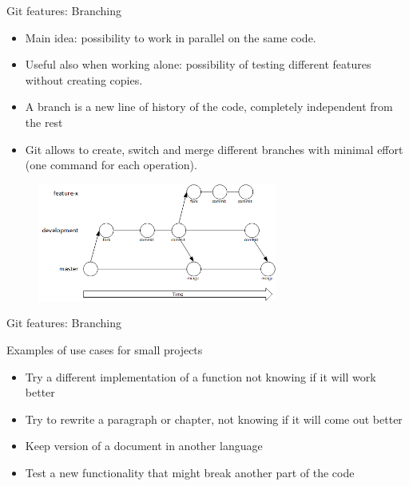 \documentclass{beamer}
\newcommand{\git}{Git{}}
\begin{document}
\begin{frame}{\git{} features: Branching}
    \begin{itemize}
    \justifying
        \item Main idea: possibility to \alert{work in parallel} on the same code. 
        \item Useful also when working alone: possibility of \alert{testing different features} without creating copies. 
        \item A \alert{branch} is a new line of history of the code, completely independent from the rest
        \item \git{} allows to \alert{create}, \alert{switch} and \alert{merge} different branches with minimal effort (one command for each operation).
    \end{itemize}

    \begin{figure}
        \centering
        \includegraphics[width=0.7\textwidth]{git_workflow_1.png}
    \end{figure}
\end{frame}

\begin{frame}{\git{} features: Branching}
    \begin{block}{Examples of use cases for small projects}
        \begin{itemize}
        \justifying
            \item Try a different implementation of a function not knowing if it will work better
            \item Try to rewrite a paragraph or chapter, not knowing if it will come out better
            \item Keep version of a document in another language
            \item Test a new functionality that might break another part of the code
        \end{itemize}
    \end{block}
\end{frame}
\end{document}
